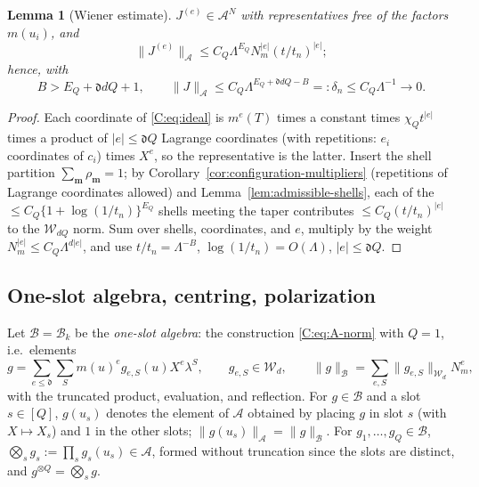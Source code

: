 \documentclass[11pt]{article}
\newtheorem{lemma}[lemma]{Lemma}
\newcommand{\cW}{\mathcal{W}}
\newcommand{\cA}{\mathcal{A}}
\newcommand{\cB}{\mathcal{B}}
\newcommand{\norm}[1]{\lVert #1\rVert}
\newcommand{\abs}[1]{\lvert #1\rvert}
\newcommand{\dg}{\mathfrak{d}}
\begin{document}
\begin{lemma}[Wiener estimate]\label{C:lem:wiener}
\(J^{(e)}\in\cA^N\) with representatives free of the factors \(m(u_i)\),
and
\[
 \norm{J^{(e)}}_\cA\le C_Q\Lambda^{E_Q}N_m^{\abs e}(t/t_n)^{\abs e};
\]
hence, with
\begin{equation}
 B>E_Q+\dg dQ+1,\qquad
 \norm{J}_\cA\le C_Q\Lambda^{E_Q+\dg dQ-B}=:\delta_n\le C_Q\Lambda^{-1}\to0 .
 \label{C:eq:wiener}
\end{equation}
\end{lemma}
\begin{proof}
Each coordinate of \eqref{C:eq:ideal} is \(m^{e}(T)\) times a constant times
\(\chi_Qt^{\abs e}\) times a product of \(\abs e\le\dg Q\) Lagrange coordinates
(with repetitions: \(e_i\) coordinates of \(c_i\)) times \(X^e\), so the
representative is the latter.  Insert the shell partition
\(\sum_{\bm m}\rho_{\bm m}=1\); by Corollary~\ref{cor:configuration-multipliers}
(repetitions of Lagrange coordinates allowed) and
Lemma~\ref{lem:admissible-shells}, each of the
\(\le C_Q\{1+\log(1/t_n)\}^{E_Q}\) shells meeting the taper contributes
\(\le C_Q(t/t_n)^{\abs e}\) to the \(\cW_{dQ}\) norm.  Sum over
shells, coordinates, and \(e\), multiply by the weight
\(N_m^{\abs e}\le C_Q\Lambda^{d\abs e}\), and use \(t/t_n=\Lambda^{-B}\),
\(\log(1/t_n)=O(\Lambda)\), \(\abs e\le\dg Q\).
\end{proof}

\subsection{One-slot algebra, centring, polarization}
Let \(\cB=\cB_k\) be the \emph{one-slot algebra}: the construction
\eqref{C:eq:A-norm} with \(Q=1\), i.e.\ elements
\[
 g=\sum_{e\le\dg}\sum_{S}m(u)^eg_{e,S}(u)X^e\lambda^S,\qquad g_{e,S}\in\cW_d,\qquad
 \norm g_\cB=\sum_{e,S}\norm{g_{e,S}}_{\cW_d}N_m^e ,
\]
with the truncated product, evaluation, and reflection.  For \(g\in\cB\) and a slot \(s\in[Q]\), \(g(u_s)\) denotes the
element of \(\cA\) obtained by placing \(g\) in slot \(s\) (with
\(X\mapsto X_s\)) and \(1\) in the other slots; \(\norm{g(u_s)}_\cA=\norm g_\cB\).
For \(g_1,\dots,g_Q\in\cB\), \(\bigotimes_sg_s:=\prod_sg_s(u_s)\in\cA\), formed
without truncation since the slots are distinct, and
\(g^{\otimes Q}=\bigotimes_sg\).
\end{document}
